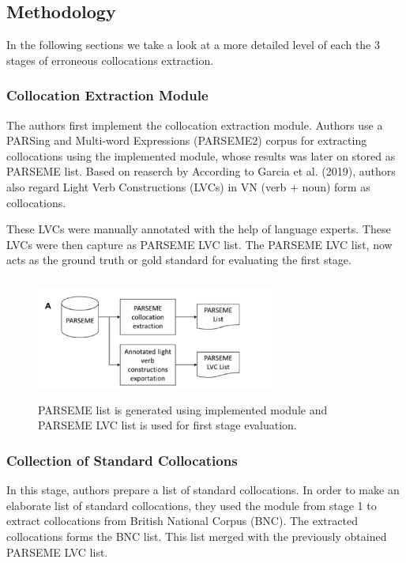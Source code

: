\documentclass[11pt,a4paper]{article}
\begin{document}
\subsection{Methodology}
In the following sections we take a look at a more detailed level of each the 3 stages of erroneous collocations extraction.

\subsubsection{Collocation Extraction Module}
The authors first implement the collocation extraction module. Authors use a PARSing and Multi-word Expressions (PARSEME2) corpus for extracting collocations using the implemented module, whose results was later on stored as PARSEME list. Based on reaserch by According to Garcia et al. (2019), authors also regard Light Verb Constructions (LVCs) in VN (verb + noun) form as collocations. 

These LVCs were manually annotated with the help of language experts. These LVCs were then capture as PARSEME LVC list. The PARSEME LVC list, now acts as the ground truth or gold standard for evaluating the first stage. 

\begin{figure}[H]
  \includegraphics[width=8cm, height=4cm]{gfx/c_stage_1.png}
  \caption{PARSEME list is generated using implemented module and PARSEME LVC list is used for first stage evaluation.}
  \label{fig:c_stage_1}
\end{figure}

\subsubsection{Collection of Standard Collocations}
In this stage, authors prepare a list of standard collocations. In order to make an elaborate list of standard collocations, they used the module from stage 1 to extract collocations from British National Corpus (BNC). The extracted collocations forms the BNC list. This list merged with the previously obtained PARSEME LVC list. 
\end{document}
